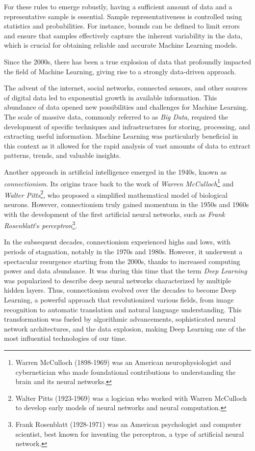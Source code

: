 \documentclass[11pt]{article}
\begin{document}
    For these rules to emerge robustly, having a sufficient amount of data and a representative sample is essential. Sample representativeness is controlled using statistics and probabilities. For instance, bounds can be defined to limit errors and ensure that samples effectively capture the inherent variability in the data, which is crucial for obtaining reliable and accurate Machine Learning models.

    Since the 2000s, there has been a true explosion of data that profoundly impacted the field of Machine Learning, giving rise to a strongly data-driven approach.

    The advent of the internet, social networks, connected sensors, and other sources of digital data led to exponential growth in available information. This abundance of data opened new possibilities and challenges for Machine Learning. The scale of massive data, commonly referred to as \textit{Big Data}, required the development of specific techniques and infrastructures for storing, processing, and extracting useful information. Machine Learning was particularly beneficial in this context as it allowed for the rapid analysis of vast amounts of data to extract patterns, trends, and valuable insights.

    Another approach in artificial intelligence emerged in the 1940s, known as \textit{connectionism}. Its origins trace back to the work of \textit{Warren McCulloch}\footnote{Warren McCulloch (1898-1969) was an American neurophysiologist and cybernetician who made foundational contributions to understanding the brain and its neural networks.} and \textit{Walter Pitts}\footnote{Walter Pitts (1923-1969) was a logician who worked with Warren McCulloch to develop early models of neural networks and neural computation.}, who proposed a simplified mathematical model of biological neurons. However, connectionism truly gained momentum in the 1950s and 1960s with the development of the first artificial neural networks, such as \textit{Frank Rosenblatt}'s \textit{perceptron}\footnote{Frank Rosenblatt (1928-1971) was an American psychologist and computer scientist, best known for inventing the perceptron, a type of artificial neural network.}.

    In the subsequent decades, connectionism experienced highs and lows, with periods of stagnation, notably in the 1970s and 1980s. However, it underwent a spectacular resurgence starting from the 2000s, thanks to increased computing power and data abundance. It was during this time that the term \textit{Deep Learning} was popularized to describe deep neural networks characterized by multiple hidden layers. Thus, connectionism evolved over the decades to become Deep Learning, a powerful approach that revolutionized various fields, from image recognition to automatic translation and natural language understanding. This transformation was fueled by algorithmic advancements, sophisticated neural network architectures, and the data explosion, making Deep Learning one of the most influential technologies of our time.
\end{document}
